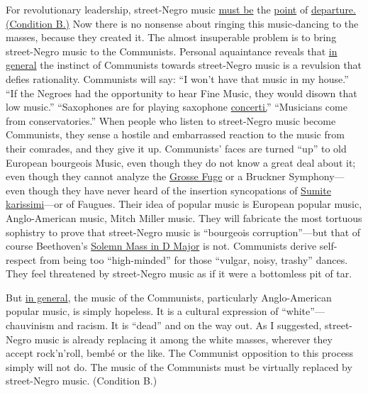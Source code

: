 For revolutionary leadership, street-Negro music \uline{must be} the 
\uline{point} of \uline{departure. (Condition B.)} Now there is no nonsense about
ringing this music-dancing to the masses, because they created
it. The almost insuperable problem is to bring street-Negro music
to the Communists. Personal aquaintance reveals that \uline{in general}
the instinct of Communists towards street-Negro music is a revulsion
that defies rationality. Communists will say: \enquote{I won't have 
that music in my house.} \enquote{If the Negroes had the opportunity to
hear Fine Music, they would disown that low music.} \enquote{Saxophones
are for playing saxophone \uline{concerti.}} \enquote{Musicians come from 
conservatories.} When people who listen to street-Negro music
become Communists, they sense a hostile and embarrassed reaction 
to the music from their comrades, and they give it up. Communists'
faces are turned \enquote{up} to old European bourgeois Music,
even though they do not know a great deal about it; even though
they cannot analyze the \uline{Grosse Fuge} or a Bruckner Symphony---even
though they have never heard of the insertion syncopations
of \uline{Sumite karissimi}---or of Faugues. Their idea of popular music
is European popular music, Anglo-American music, Mitch Miller 
music. They will fabricate the most tortuous sophistry to prove
that street-Negro music is \enquote{bourgeois corruption}---but that of
course Beethoven's \uline{Solemn Mass in D Major} is not. Communists 
derive self-respect from being too \enquote{high-minded} for those \enquote{vulgar, noisy, trashy} dances. They feel threatened by street-Negro music 
as if it were a bottomless pit of tar. 

But \uline{in general}, the music of the Communists, particularly Anglo-American
popular music, is simply hopeless. It is a cultural expression
of \enquote{white}---chauvinism and racism. It is \enquote{dead} and on
the way out. As I suggested, street-Negro music is already replacing
it among the white masses, wherever they accept rock'n'roll, 
bemb\'{e} or the like. The Communist opposition to this process 
simply will not do. The music of the Communists must be virtually 
replaced by street-Negro music. (Condition B.) 


